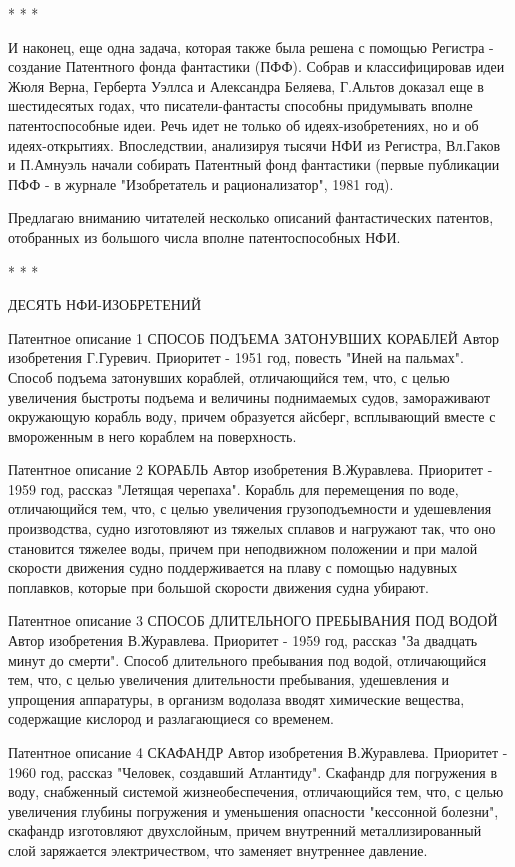 \documentclass[11pt,a4paper]{article}
\begin{document}
* * *

И наконец, еще одна задача, которая также была решена с помощью Регистра - создание Патентного фонда фантастики (ПФФ). Собрав и классифицировав идеи Жюля Верна, Герберта Уэллса и Александра Беляева, Г.Альтов доказал еще в шестидесятых годах, что писатели-фантасты способны придумывать вполне патентоспособные идеи. Речь идет не только об идеях-изобретениях, но и об идеях-открытиях. Впоследствии, анализируя тысячи НФИ из Регистра, Вл.Гаков и П.Амнуэль начали собирать Патентный фонд фантастики (первые публикации ПФФ - в журнале "Изобретатель и рационализатор", 1981 год).

Предлагаю вниманию читателей несколько описаний фантастических патентов, отобранных из большого числа вполне патентоспособных НФИ.

* * *

ДЕСЯТЬ НФИ-ИЗОБРЕТЕНИЙ

Патентное описание 1
СПОСОБ ПОДЪЕМА ЗАТОНУВШИХ КОРАБЛЕЙ
Автор изобретения Г.Гуревич. Приоритет - 1951 год, повесть "Иней на пальмах".
Способ подъема затонувших кораблей, отличающийся тем, что, с целью увеличения быстроты подъема и величины поднимаемых судов, замораживают окружающую корабль воду, причем образуется айсберг, всплывающий вместе с вмороженным в него кораблем на поверхность.

Патентное описание 2
КОРАБЛЬ
Автор изобретения В.Журавлева. Приоритет - 1959 год, рассказ "Летящая черепаха".
Корабль для перемещения по воде, отличающийся тем, что, с целью увеличения грузоподъемности и удешевления производства, судно изготовляют из тяжелых сплавов и нагружают так, что оно становится тяжелее воды, причем при неподвижном положении и при малой скорости движения судно поддерживается на плаву с помощью надувных поплавков, которые при большой скорости движения судна убирают.

Патентное описание 3
СПОСОБ ДЛИТЕЛЬНОГО ПРЕБЫВАНИЯ ПОД ВОДОЙ
Автор изобретения В.Журавлева. Приоритет - 1959 год, рассказ "За двадцать минут до смерти".
Способ длительного пребывания под водой, отличающийся тем, что, с целью увеличения длительности пребывания, удешевления и упрощения аппаратуры, в организм водолаза вводят химические вещества, содержащие кислород и разлагающиеся со временем.

Патентное описание 4
СКАФАНДР
Автор изобретения В.Журавлева. Приоритет - 1960 год, рассказ "Человек, создавший Атлантиду".
Скафандр для погружения в воду, снабженный системой жизнеобеспечения, отличающийся тем, что, с целью увеличения глубины погружения и уменьшения опасности "кессонной болезни", скафандр изготовляют двухслойным, причем внутренний металлизированный слой заряжается электричеством, что заменяет внутреннее давление.
\end{document}

